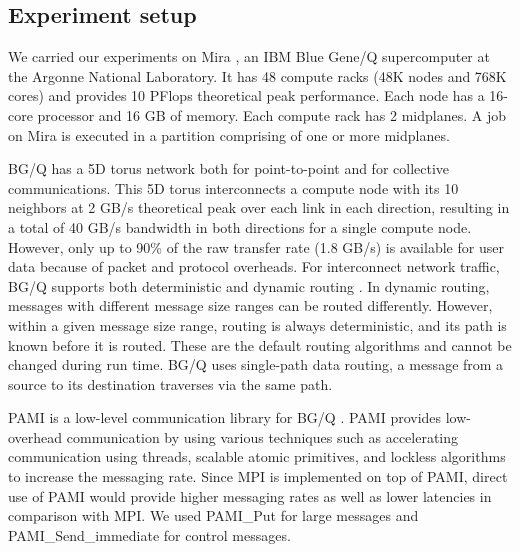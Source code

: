 \subsection{Experiment setup}
\label{sec:system}

We carried our experiments on Mira \cite{Chen:BGQ}, an IBM Blue Gene/Q supercomputer at the Argonne National Laboratory. It has 48 compute racks (48K nodes and 768K cores) and provides 10 PFlops theoretical peak performance. Each node has a 16-core processor and 16 GB of memory. Each compute rack has 2 midplanes. A job on Mira is executed in a partition comprising of one or more midplanes. 

BG/Q has a 5D torus network both for point-to-point and for collective communications. This 5D torus interconnects a compute node with its 10 neighbors at 2 GB/s theoretical peak over each link in each direction, resulting in a total of 40 GB/s bandwidth in both directions for a single compute node. However, only up to 90\% of the raw transfer rate (1.8 GB/s) is available for user data because of packet and protocol overheads.  
For interconnect network traffic, BG/Q supports both deterministic and dynamic routing \cite{Chen:BGQ}. In dynamic routing, messages with different message size ranges can be routed differently. However, within a given message size range, routing is always deterministic, and its path is known before it is routed. These are the default routing algorithms and cannot be changed during run time. BG/Q uses single-path data routing, a message from a source to its destination traverses via the same path.

PAMI is a low-level communication library for BG/Q \cite{PAMI:Kumar}. PAMI provides low-overhead communication by using various techniques such as accelerating communication using threads, scalable atomic primitives, and lockless algorithms to increase the messaging rate. Since MPI is implemented on top of PAMI, direct use of PAMI would provide higher messaging rates as well as lower latencies in comparison with MPI. We used PAMI\_Put for large messages and PAMI\_Send\_immediate for control messages.

